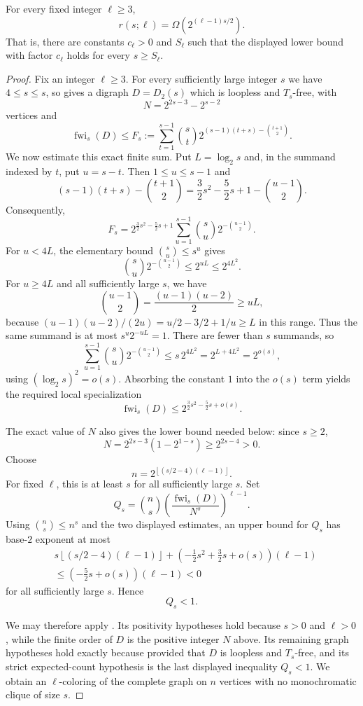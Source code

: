 \begin{theorem}
For every fixed integer $\ell\geq3$,
\[
 r(s;\ell)=\Omega\!\left(2^{(\ell-1)s/2}\right).
\]
That is, there are constants $c_\ell>0$ and $S_\ell$ such that the displayed
lower bound with factor $c_\ell$ holds for every $s\geq S_\ell$.
\end{theorem}
\begin{proof}
Fix an integer $\ell\geq3$.  For every sufficiently large integer $s$ we
have $4\leq s\leq s$, so  gives a
digraph $D=D_2(s)$ which is loopless and $T_s$-free, with
\[
 N=2^{2s-3}-2^{s-2}
\]
vertices and
\[
 \operatorname{fwi}_s(D)\leq
 F_s:=\sum_{t=1}^{s-1}\binom{s}{t}
 2^{(s-1)(t+s)-\binom{t+1}{2}}.
\]
We now estimate this exact finite sum.  Put $L=\log_2 s$ and, in the
summand indexed by $t$, put $u=s-t$.  Then $1\leq u\leq s-1$ and
\[
 (s-1)(t+s)-\binom{t+1}{2}
 =\frac32s^2-\frac52s+1-\binom{u-1}{2}.
\]
Consequently,
\[
 F_s=2^{\frac32s^2-\frac52s+1}
 \sum_{u=1}^{s-1}\binom{s}{u}2^{-\binom{u-1}{2}}.
\]
For $u<4L$, the elementary bound $\binom{s}{u}\leq s^u$ gives
\[
 \binom{s}{u}2^{-\binom{u-1}{2}}
 \leq 2^{uL}\leq2^{4L^2}.
\]
For $u\geq4L$ and all sufficiently large $s$, we have
\[
 \binom{u-1}{2}=\frac{(u-1)(u-2)}2\geq uL,
\]
because $(u-1)(u-2)/(2u)=u/2-3/2+1/u\geq L$ in this range.
Thus the same summand is at most $s^u2^{-uL}=1$.  There are fewer
than $s$ summands, so
\[
 \sum_{u=1}^{s-1}\binom{s}{u}2^{-\binom{u-1}{2}}
 \leq s\,2^{4L^2}=2^{L+4L^2}=2^{o(s)},
\]
using $(\log_2s)^2=o(s)$.  Absorbing the constant $1$ into the
$o(s)$ term yields the required local specialization
\[
 \operatorname{fwi}_s(D)\leq
 2^{\frac32s^2-\frac52s+o(s)}.
\]

The exact value of $N$ also gives the lower bound needed below: since
$s\geq2$,
\[
 N=2^{2s-3}(1-2^{1-s})\geq2^{2s-4}>0.
\]
Choose
\[
 n=2^{\left\lfloor(s/2-4)(\ell-1)\right\rfloor}.
\]
For fixed $\ell$, this is at least $s$ for all sufficiently large $s$.
Set
\[
 Q_s=\binom ns\left(\frac{\operatorname{fwi}_s(D)}{N^s}\right)^{\ell-1}.
\]
Using $\binom ns\leq n^s$ and the two displayed estimates, an upper bound
for $Q_s$ has base-$2$ exponent at most
\begin{align*}
 &s\left\lfloor(s/2-4)(\ell-1)\right\rfloor
 +\left(-\frac12s^2+\frac32s+o(s)\right)(\ell-1)\\
 &\leq \left(-\frac52s+o(s)\right)(\ell-1)<0
\end{align*}
for all sufficiently large $s$.  Hence
\[
 Q_s<1.
\]

We may therefore apply .  Its
positivity hypotheses hold because $s>0$ and $\ell>0$, while the finite
order of $D$ is the positive integer $N$ above.  Its remaining graph
hypotheses hold exactly because 
provided that $D$ is loopless and $T_s$-free, and its strict expected-count
hypothesis is the last displayed inequality $Q_s<1$.  We obtain an
$\ell$-coloring
of the complete graph on $n$ vertices with no monochromatic clique of size
$s$.


\end{proof}
